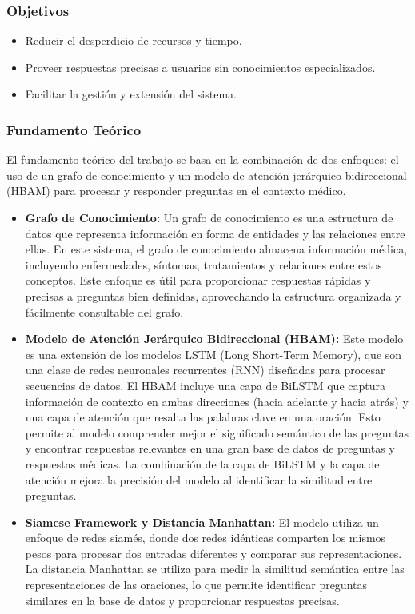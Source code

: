 	\subsubsection{Objetivos}
		\begin{itemize}
			\item Reducir el desperdicio de recursos y tiempo.
			
			\item Proveer respuestas precisas a usuarios sin conocimientos especializados.
			
			\item Facilitar la gestión y extensión del sistema.
		\end{itemize}


	
	\subsubsection{Fundamento Teórico}
	El fundamento teórico del trabajo se basa en la combinación de dos enfoques: el uso de un grafo de conocimiento y un modelo de atención jerárquico bidireccional (HBAM) para procesar y responder preguntas en el contexto médico.
		
		\begin{itemize}
			\item \textbf{ Grafo de Conocimiento:} Un grafo de conocimiento es una estructura de datos que representa información en forma de entidades y las relaciones entre ellas. En este sistema, el grafo de conocimiento almacena información médica, incluyendo enfermedades, síntomas, tratamientos y relaciones entre estos conceptos. Este enfoque es útil para proporcionar respuestas rápidas y precisas a preguntas bien definidas, aprovechando la estructura organizada y fácilmente consultable del grafo.
		
			\item \textbf{Modelo de Atención Jerárquico Bidireccional (HBAM):} Este modelo es una extensión de los modelos LSTM (Long Short-Term Memory), que son una clase de redes neuronales recurrentes (RNN) diseñadas para procesar secuencias de datos. El HBAM incluye una capa de BiLSTM que captura información de contexto en ambas direcciones (hacia adelante y hacia atrás) y una capa de atención que resalta las palabras clave en una oración. Esto permite al modelo comprender mejor el significado semántico de las preguntas y encontrar respuestas relevantes en una gran base de datos de preguntas y respuestas médicas. La combinación de la capa de BiLSTM y la capa de atención mejora la precisión del modelo al identificar la similitud entre preguntas.
		
			\item \textbf{Siamese Framework y Distancia Manhattan:} El modelo utiliza un enfoque de redes siamés, donde dos redes idénticas comparten los mismos pesos para procesar dos entradas diferentes y comparar sus representaciones. La distancia Manhattan se utiliza para medir la similitud semántica entre las representaciones de las oraciones, lo que permite identificar preguntas similares en la base de datos y proporcionar respuestas precisas.
		
		\end{itemize}
		
